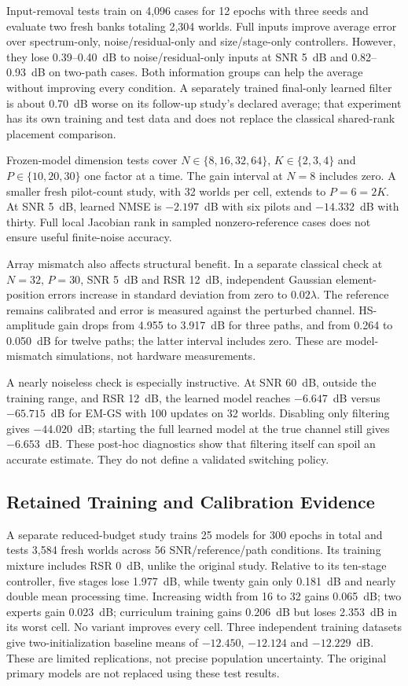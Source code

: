 \documentclass[10pt,journal,letterpaper]{IEEEtran}
\begin{document}
Input-removal tests train on 4,096 cases for 12 epochs with three seeds and evaluate two fresh banks totaling 2,304 worlds. Full inputs improve average error over spectrum-only, noise/residual-only and size/stage-only controllers. However, they lose 0.39--0.40~dB to noise/residual-only inputs at SNR 5~dB and 0.82--0.93~dB on two-path cases. Both information groups can help the average without improving every condition. A separately trained final-only learned filter is about 0.70~dB worse on its follow-up study's declared average; that experiment has its own training and test data and does not replace the classical shared-rank placement comparison.

Frozen-model dimension tests cover $N\in\{8,16,32,64\}$, $K\in\{2,3,4\}$ and $P\in\{10,20,30\}$ one factor at a time. The gain interval at $N=8$ includes zero. A smaller fresh pilot-count study, with 32 worlds per cell, extends to $P=6=2K$. At SNR 5~dB, learned NMSE is $-2.197$~dB with six pilots and $-14.332$~dB with thirty. Full local Jacobian rank in sampled nonzero-reference cases does not ensure useful finite-noise accuracy.

Array mismatch also affects structural benefit. In a separate classical check at $N=32$, $P=30$, SNR 5~dB and RSR 12~dB, independent Gaussian element-position errors increase in standard deviation from zero to $0.02\lambda$. The reference remains calibrated and error is measured against the perturbed channel. HS-amplitude gain drops from 4.955 to 3.917~dB for three paths, and from 0.264 to 0.050~dB for twelve paths; the latter interval includes zero. These are model-mismatch simulations, not hardware measurements.

A nearly noiseless check is especially instructive. At SNR 60~dB, outside the training range, and RSR 12~dB, the learned model reaches $-6.647$~dB versus $-65.715$~dB for EM-GS with 100 updates on 32 worlds. Disabling only filtering gives $-44.020$~dB; starting the full learned model at the true channel still gives $-6.653$~dB. These post-hoc diagnostics show that filtering itself can spoil an accurate estimate. They do not define a validated switching policy.

\subsection{Retained Training and Calibration Evidence}
A separate reduced-budget study trains 25 models for 300 epochs in total and tests 3,584 fresh worlds across 56 SNR/reference/path conditions. Its training mixture includes RSR 0~dB, unlike the original study. Relative to its ten-stage controller, five stages lose 1.977~dB, while twenty gain only 0.181~dB and nearly double mean processing time. Increasing width from 16 to 32 gains 0.065~dB; two experts gain 0.023~dB; curriculum training gains 0.206~dB but loses 2.353~dB in its worst cell. No variant improves every cell. Three independent training datasets give two-initialization baseline means of $-12.450$, $-12.124$ and $-12.229$~dB. These are limited replications, not precise population uncertainty. The original primary models are not replaced using these test results.
\end{document}
